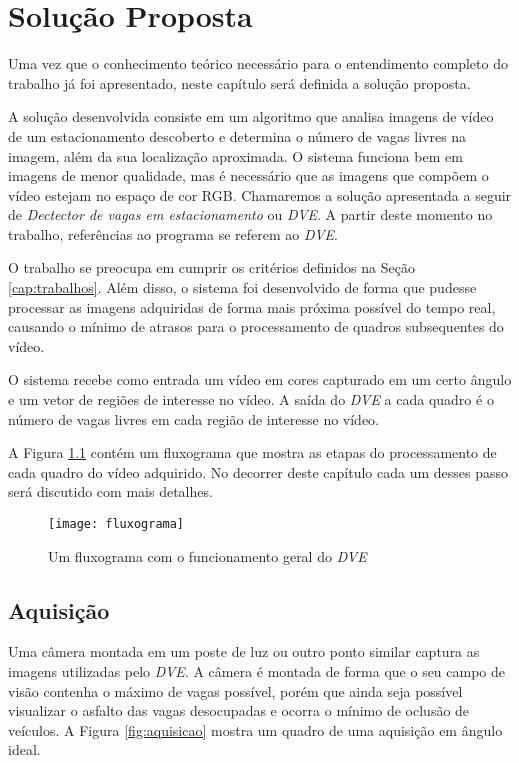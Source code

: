 \chapter{Solução Proposta}\label{cap:solucao}

Uma vez que o conhecimento teórico necessário para o entendimento completo do trabalho já foi apresentado, neste capítulo será definida a solução proposta.

A solução desenvolvida consiste em um algoritmo que analisa imagens de vídeo de um estacionamento descoberto e determina o número de vagas livres na imagem, além da sua localização aproximada. O sistema funciona bem em imagens de menor qualidade, mas é necessário que as imagens que compõem o vídeo estejam no espaço de cor RGB. Chamaremos a solução apresentada a seguir de \textit{Dectector de vagas em estacionamento} ou \textit{DVE}. A partir deste momento no trabalho, referências ao programa se referem ao \textit{DVE}.

O trabalho se preocupa em cumprir os critérios definidos na Seção \ref{cap:trabalhos}. Além disso, o sistema foi desenvolvido de forma que pudesse processar as imagens adquiridas de forma mais próxima possível do tempo real, causando o mínimo de atrasos para o processamento de quadros subsequentes do vídeo.

O sistema recebe como entrada um vídeo em cores capturado em um certo ângulo e um vetor de regiões de interesse no vídeo. A saída do \textit{DVE} a cada quadro é o número de vagas livres em cada região de interesse no vídeo.

A Figura \ref{fig:fluxograma} contém um fluxograma que mostra as etapas do processamento de cada quadro do vídeo adquirido. No decorrer deste capítulo cada um desses passo será discutido com mais detalhes.

\begin{figure}
	\centering
	\texttt{[image: fluxograma]}
	\caption{Um fluxograma com o funcionamento geral do \textit{DVE}}
	\label{fig:fluxograma}
	\centering
\end{figure}



\section{Aquisição}\label{sec:aquisicao}

Uma câmera montada em um poste de luz ou outro ponto similar captura as imagens utilizadas pelo \textit{DVE}. A câmera é montada de forma que o seu campo de visão contenha o máximo de vagas possível, porém que ainda seja possível visualizar o asfalto das vagas desocupadas e ocorra o mínimo de oclusão de veículos. A Figura \ref{fig:aquisicao} mostra um quadro de uma aquisição em ângulo ideal.

